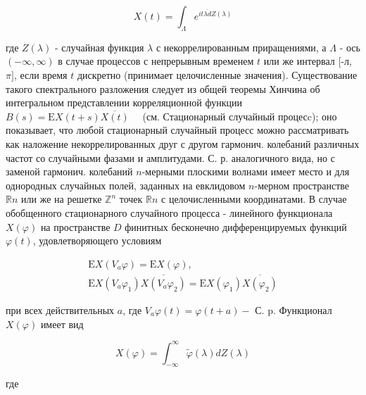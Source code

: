 \documentclass[10pt]{article}
\begin{document}
\[

X(t)=\int_{\Lambda} e^{\overline{i t \lambda d Z}(\lambda)}

\]



где $Z(\lambda)$ - случайная функция $\lambda$ с некоррелированным приращениями, а $\Lambda$ - ось $(-\infty, \infty)$ в случае процессов с непрерывным временем $t$ или же интервал [-л, $\pi]$, если время $t$ дискретно (принимает целочисленные значения). Существование такого спектрального разложения следует из общей теоремы Хинчина об интегральном представлении корреляционной функции $B(s)=\mathrm{E} X(t+s) \overline{X(t)} \quad$ (см. Стационарный случайный процесc); оно показывает, что любой стационарный случайный процесс можно рассматривать как наложение некоррелированных друг с другом гармонич. колебаний различных частот со случайными фазами и амплитудами. С. р. аналогичного вида, но с заменой гармонич. колебаний $n$-мерными плоскими волнами имеет место и для однородных случайных полей, заданных на евклидовом $n$-мерном пространстве $\mathbb{R} n$ или же на решетке $\mathbb{Z}^{n}$ точек $\mathbb{R} n$ с целочисленными координатами. В случае обобщенного стационарного случайного процесса - линейного функционала $X(\varphi)$ на пространстве $D$ финитных бесконечно дифференцируемых функций $\varphi(t)$, удовлетворяющего условиям



\[

\begin{gathered}

\mathrm{E} X\left(V_{a} \varphi\right)=\mathrm{E} X(\varphi), \\

\mathrm{E} X\left(V_{a} \varphi_{1}\right) \overline{X\left(V_{a} \varphi_{2}\right)}=\mathrm{E} X\left(\varphi_{1}\right) \overline{X\left(\varphi_{2}\right)}

\end{gathered}

\]



при всех действительных $a$, где $V_{a} \varphi(t)=\varphi(t+a)-$ С. p. Функционал $X(\varphi)$ имеет вид



\[

X(\varphi)=\int_{-\infty}^{\infty} \tilde{\varphi}(\lambda) d Z(\lambda)

\]



где
\end{document}
